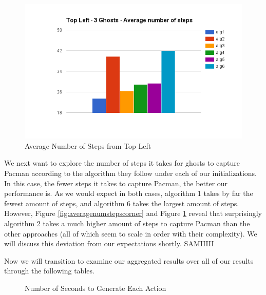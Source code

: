 \documentclass[11pt]{article}
\begin{document}
\begin{multicols}{2}
\begin{figure}[H]
	\includegraphics[width=\columnwidth]{leftsteps.png}
	\caption{Average Number of Steps from Top Left}
	\label{fig:averagenumstepsleft}
\end{figure}

We next want to explore the number of steps it takes for ghosts to capture Pacman according to the algorithm they follow under each of our initializations. In this case, the fewer steps it takes to capture Pacman, the better our performance is. As we would expect in both cases, algorithm 1 takes by far the fewest amount of steps, and algorithm 6 takes the largest amount of steps. However, Figure \ref{fig:averagenumstepscorner} and Figure \ref{fig:averagenumstepsleft} reveal that surprisingly algorithm 2 takes a much higher amount of steps to capture Pacman than the other approaches (all of which seem to scale in order with their complexity). We will discuss this deviation from our expectations shortly. SAMIIIII

Now we will transition to examine our aggregated results over all of our results through the following tables. 

\end{multicols}

\begin{figure}[H]
	\caption{Number of Seconds to Generate Each Action}
\end{figure}
\end{document}
